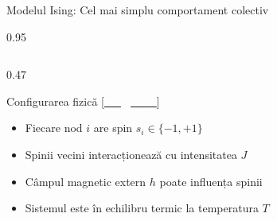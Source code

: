 \documentclass[9pt, aspectratio=169, t]{beamer}
\begin{document}
\begin{frame}{Modelul Ising: Cel mai simplu comportament colectiv}
    \begin{cminipage}{0.95\textwidth}
    {\scriptsize
    \begin{columns}[T]
        \begin{column}{0.47\textwidth}
            \begin{block}{Configurarea fizică {\scriptsize[\href{https://doi.org/10.1007/BF02980577}{\textcolor{white}{Ising, 1925}}]}}
                \begin{itemize}\setlength{\itemsep}{0pt}
                    \item Fiecare nod $i$ are spin $s_i \in \{-1, +1\}$
                    \item Spinii vecini interacționează cu intensitatea $J$
                    \item Câmpul magnetic extern $h$ poate influența spinii
                    \item Sistemul este în echilibru termic la temperatura $T$
                \end{itemize}
            \end{block}


\end{column}
\end{columns}}
\end{cminipage}
\end{frame}
\end{document}
